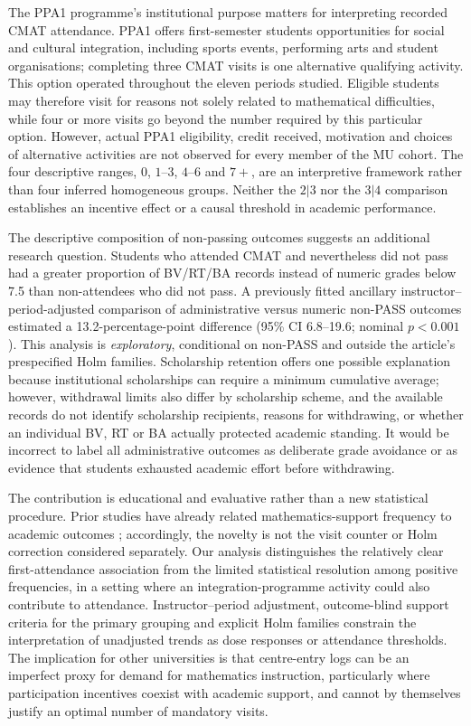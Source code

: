 The PPA1 programme's institutional purpose matters for interpreting recorded CMAT attendance. PPA1 offers first-semester students opportunities for social and cultural integration, including sports events, performing arts and student organisations; completing three CMAT visits is one alternative qualifying activity. This option operated throughout the eleven periods studied. Eligible students may therefore visit for reasons not solely related to mathematical difficulties, while four or more visits go beyond the number required by this particular option. However, actual PPA1 eligibility, credit received, motivation and choices of alternative activities are not observed for every member of the MU cohort. The four descriptive ranges, $0$, $1$--$3$, $4$--$6$ and $7+$, are an interpretive framework rather than four inferred homogeneous groups. Neither the $2|3$ nor the $3|4$ comparison establishes an incentive effect or a causal threshold in academic performance.

The descriptive composition of non-passing outcomes suggests an additional research question. Students who attended CMAT and nevertheless did not pass had a greater proportion of BV/RT/BA records instead of numeric grades below 7.5 than non-attendees who did not pass. A previously fitted ancillary instructor--period-adjusted comparison of administrative versus numeric non-PASS outcomes estimated a 13.2-percentage-point difference (95\% CI 6.8--19.6; nominal $p<0.001$). This analysis is \emph{exploratory}, conditional on non-PASS and outside the article's prespecified Holm families. Scholarship retention offers one possible explanation because institutional scholarships can require a minimum cumulative average; however, withdrawal limits also differ by scholarship scheme, and the available records do not identify scholarship recipients, reasons for withdrawing, or whether an individual BV, RT or BA actually protected academic standing. It would be incorrect to label all administrative outcomes as deliberate grade avoidance or as evidence that students exhausted academic effort before withdrawing.

The contribution is educational and evaluative rather than a new statistical procedure. Prior studies have already related mathematics-support frequency to academic outcomes \citep{jacob2019,rickard2018}; accordingly, the novelty is not the visit counter or Holm correction considered separately. Our analysis distinguishes the relatively clear first-attendance association from the limited statistical resolution among positive frequencies, in a setting where an integration-programme activity could also contribute to attendance. Instructor--period adjustment, outcome-blind support criteria for the primary grouping and explicit Holm families constrain the interpretation of unadjusted trends as dose responses or attendance thresholds. The implication for other universities is that centre-entry logs can be an imperfect proxy for demand for mathematics instruction, particularly where participation incentives coexist with academic support, and cannot by themselves justify an optimal number of mandatory visits.

